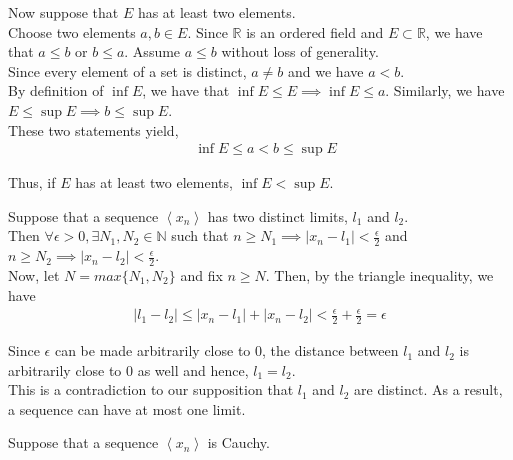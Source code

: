 \documentclass[12pt]{article}
\newenvironment{problem}[2][Problem]{\begin{trivlist}
\item[\hskip \labelsep {\bfseries #1}\hskip \labelsep {\bfseries #2.}]}{\end{trivlist}}
\begin{document}
Now suppose that $E$ has at least two elements.\\

Choose two elements $a, b \in E$. Since $\mathbb{R}$ is an ordered field and $E \subset \mathbb{R}$, we have that $a \leq b$ or $b \leq a$. Assume $a \leq b$ without loss of generality.\\

Since every element of a set is distinct, $a \neq b$ and we have $a < b$.\\

By definition of $\inf E$, we have that $\inf E \leq E \implies \inf E \leq a$. Similarly, we have $E \leq \sup E \implies b \leq \sup E$.\\

These two statements yield,
\begin{align*}
&\inf E \leq a < b \leq \sup E
\end{align*}

Thus, if $E$ has at least two elements, $\inf E < \sup E$.

\begin{problem}{3}
\end{problem}	

Suppose that a sequence $\left<x_n\right>$ has two distinct limits, $l_1$ and $l_2$.\\

Then $\forall \epsilon > 0, \exists N_1, N_2 \in \mathbb{N}$ such that $n \geq N_1 \implies | x_n - l_1 | < \frac{\epsilon}{2}$ and $n \geq N_2 \implies | x_n - l_2 | < \frac{\epsilon}{2}$.\\

Now, let $N = max\{N_1, N_2\}$ and fix $n \geq N$. Then, by the triangle inequality, we have
\begin{align*}
| l_1 - l_2 | \leq | x_n - l_1 | + | x_n - l_2 | < \frac{\epsilon}{2} + \frac{\epsilon}{2} = \epsilon
\end{align*}

Since $\epsilon$ can be made arbitrarily close to 0, the distance between $l_1$ and $l_2$ is arbitrarily close to 0 as well and hence, $l_1 = l_2$.\\

This is a contradiction to our supposition that $l_1$ and $l_2$ are distinct. As a result, a sequence can have at most one limit.

\begin{problem}{4}
\end{problem}

Suppose that a sequence $\left<x_n\right>$ is Cauchy.\\
\end{document}
